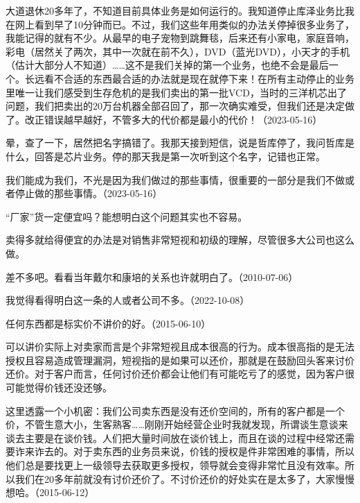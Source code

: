 大道退休20多年了，不知道目前具体业务是如何运行的。我知道停止库泽业务比我在网上看到早了10分钟而已。不过，我们这些年用类似的办法关停掉很多业务了，我能记得的就有不少。从最早的电子宠物到跳舞毯，后来还有小家电，家庭音响，彩电（居然关了两次，其中一次就在前不久），DVD（蓝光DVD），小天才的手机（估计大部分人不知道）……这不是我们关掉的第一个业务，也绝不会是最后一个。长远看不合适的东西最合适的办法就是现在就停下来！在所有主动停止的业务里唯一让我们感受到生存危机的是我们卖出的第一批VCD，当时的三洋机芯出了问题，我们把卖出的20万台机器全部召回了，那一次确实难受，但我们还是决定做了。改正错误越早越好，不管多大的代价都是最小的代价！（2023-05-16）


晕，查了一下，居然把名字搞错了。我那天接到短信，说是哲库停了，我问哲库是什么，回答是芯片业务。停的那天我是第一次听到这个名字，记错也正常。

我们能成为我们，不光是因为我们做过的那些事情，很重要的一部分是我们不做或者停止做的那些事情。（2023-05-16）



“厂家”货一定便宜吗？能想明白这个问题其实也不容易。


卖得多就给得便宜的办法是对销售非常短视和初级的理解，尽管很多大公司也这么做。


差不多吧。看看当年戴尔和康培的关系也许就明白了。（2010-07-06）

我觉得看得明白这一条的人或者公司不多。（2022-10-08）


任何东西都是标实价不讲价的好。（2015-06-10）

可以讲价实际上对卖家而言是个非常短视且成本很高的行为。成本很高指的是无法授权且容易造成管理漏洞，短视指的是如果可以还价，那就是在鼓励回头客来讨价还价。对于客户而言，任何讨价还价都会让他们有可能吃亏了的感觉，因为客户很可能觉得价钱还没还够。

这里透露一个小机密：我们公司卖东西是没有还价空间的，所有的客户都是一个价，不管生意大小，生客熟客……刚刚开始经营企业时我就发现，所谓谈生意谈来谈去主要是在谈价钱。人们把大量时间放在谈价钱上，而且在谈的过程中经常还需要诈来诈去的。对于卖东西的业务员来说，价钱的授权是件非常困难的事情，所以他们总是要找更上一级领导去获取更多授权，领导就会变得非常忙且没有效率。所以我们在20多年前就没有讨价还价了。不讨价还价的好处实在是太多了，大家慢慢想哈。（2015-06-12）

